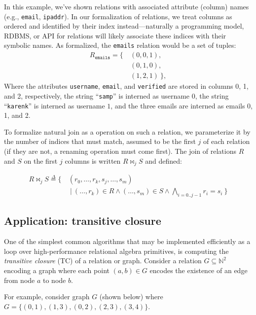 In this example, we've shown relations with associated attribute (column) names (e.g., \texttt{email}, \texttt{ipaddr}). In our formalization of relations, we treat columns as ordered and identified by their index instead---naturally a programming model, RDBMS, or API for relations will likely associate these indices with their symbolic names. As formalized, the \texttt{emails} relation would be a set of tuples:
%
\begin{align*}
  R_\texttt{emails} = \{
  &
  \ (0,0,1),
  \\
  &\ (0,1,0),
  \\
  &\ (1,2,1)\ \},
\end{align*}
%
Where the attributes \texttt{username}, \texttt{email}, and \texttt{verified} are stored in columns 0, 1, and 2, respectively, the string ``\texttt{samp}'' is interned as username $0$, the string ``\texttt{karenk}'' is interned as username $1$, and the three emails are interned as emails 0, 1, and 2.  

To formalize natural join as a operation on such a relation, we parameterize it by the number of indices that must match, assumed to be the first $j$ of each relation (if they are not, a renaming operation must come first). The join of relations $R$ and $S$ on the first $j$ columns is written $R \bowtie_j S$ and defined:

\begin{align*}
  R \bowtie_j S \overset{\Delta}{=} \{\ & (r_0,\ldots,r_k,s_j,\ldots,s_m)\
  \\
  &\ \vert\ (\ldots,r_k) \in R \wedge (\ldots,s_m) \in S \wedge \!\!\!\!\bigwedge_{i=0..{j-1}}\!\!\!\! r_i = s_i \ \}
\end{align*}

\subsection{Application: transitive closure}
\label{sec:ra:tc}
%
One of the simplest common algorithms that may be implemented efficiently as a loop over high-performance relational algebra primitives, is computing the \emph{transitive closure} (TC) of a relation or graph. Consider a relation $G \subseteq \mathbb{N}^2$ encoding a graph where each point $(a,b) \in G$ encodes the existence of an edge from node $a$ to node $b$.

For example, consider graph $G$ (shown below) where \newline$G = \{(0,1), (1,3), (0,2), (2,3), (3,4)\}$. 

